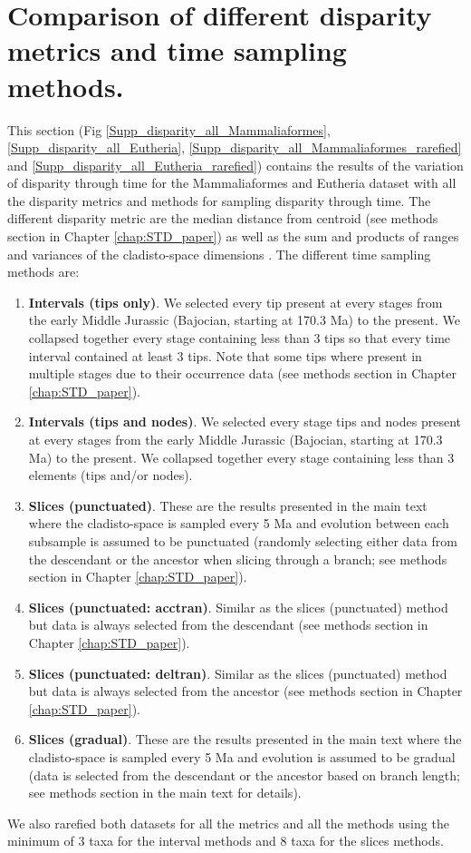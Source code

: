 \section{Comparison of different disparity metrics and time sampling methods.}
This section (Fig \ref{Supp_disparity_all_Mammaliaformes}, \ref{Supp_disparity_all_Eutheria}, \ref{Supp_disparity_all_Mammaliaformes_rarefied} and \ref{Supp_disparity_all_Eutheria_rarefied}) contains the results of the variation of disparity through time for the Mammaliaformes and Eutheria dataset with all the disparity metrics and methods for sampling disparity through time.
The different disparity metric are the median distance from centroid (see methods section in Chapter \ref{chap:STD_paper}) as well as the sum and products of ranges and variances of the cladisto-space dimensions \cite{Wills1994}.
The different time sampling methods are:
\begin{enumerate}
\item \textbf{Intervals (tips only)}.
We selected every tip present at every stages from the early Middle Jurassic (Bajocian, starting at 170.3 Ma) to the present.
We collapsed together every stage containing less than 3 tips so that every time interval contained at least 3 tips. Note that some tips where present in multiple stages due to their occurrence data (see methods section in Chapter \ref{chap:STD_paper}).
\item \textbf{Intervals (tips and nodes)}.
We selected every stage tips and nodes present at every stages from the early Middle Jurassic (Bajocian, starting at 170.3 Ma) to the present.
We collapsed together every stage containing less than 3 elements (tips and/or nodes).
\item \textbf{Slices (punctuated)}.
These are the results presented in the main text where the cladisto-space is sampled every 5 Ma and evolution between each subsample is assumed to be punctuated (randomly selecting either data from the descendant or the ancestor when slicing through a branch; see methods section in Chapter \ref{chap:STD_paper}).
\item \textbf{Slices (punctuated: acctran)}.
Similar as the slices (punctuated) method but data is always selected from the descendant (see methods section in Chapter \ref{chap:STD_paper}).
\item \textbf{Slices (punctuated: deltran)}.
Similar as the slices (punctuated) method but data is always selected from the ancestor (see methods section in Chapter \ref{chap:STD_paper}).
\item \textbf{Slices (gradual)}.
These are the results presented in the main text where the cladisto-space is sampled every 5 Ma and evolution is assumed to be gradual (data is selected from the descendant or the ancestor based on branch length; see methods section in the main text for details).
\end{enumerate}
We also rarefied both datasets for all the metrics and all the methods using the minimum of 3 taxa for the interval methods and 8 taxa for the slices methods.

